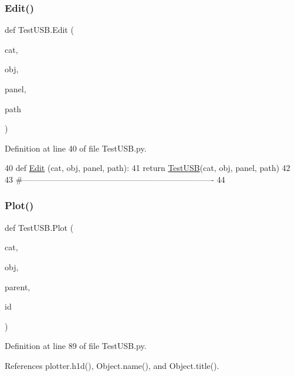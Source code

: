 \subsubsection{\texorpdfstring{Edit()}{Edit()}}
{\footnotesize\ttfamily def Test\+U\+S\+B.\+Edit (\begin{DoxyParamCaption}\item[{}]{cat,  }\item[{}]{obj,  }\item[{}]{panel,  }\item[{}]{path }\end{DoxyParamCaption})}



Definition at line 40 of file Test\+U\+S\+B.\+py.


\begin{DoxyCode}
40 \textcolor{keyword}{def }\hyperlink{namespaceTestUSB_a5ac50521a0047976653a8b8783d3c346}{Edit} (cat, obj, panel, path):
41     \textcolor{keywordflow}{return} \hyperlink{classTestUSB}{TestUSB}(cat, obj, panel, path)
42 
43 \textcolor{comment}{#----------------------------------------------------------------------}
44 
\end{DoxyCode}
\mbox{\label{namespaceTestUSB_addf95447225d96da0174da67621d6491}} 
\subsubsection{\texorpdfstring{Plot()}{Plot()}}
{\footnotesize\ttfamily def Test\+U\+S\+B.\+Plot (\begin{DoxyParamCaption}\item[{}]{cat,  }\item[{}]{obj,  }\item[{}]{parent,  }\item[{}]{id }\end{DoxyParamCaption})}



Definition at line 89 of file Test\+U\+S\+B.\+py.



References plotter.\+h1d(), Object.\+name(), and Object.\+title().



